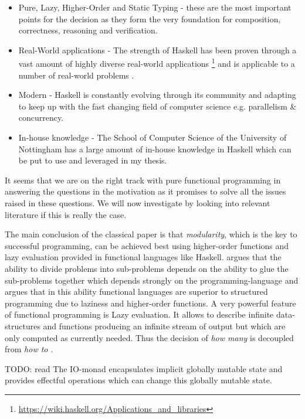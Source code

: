 \begin{itemize}
	\item Pure, Lazy, Higher-Order and Static Typing - these are the most important points for the decision as they form the very foundation for composition, correctness, reasoning and verification. 
	\item Real-World applications - The strength of Haskell has been proven through a vast amount of highly diverse real-world applications \footnote{\url{https://wiki.haskell.org/Applications_and_libraries}} \cite{hudak_history_2007} and is applicable to a number of real-world problems \cite{osullivan_real_2008}.
	\item Modern - Haskell is constantly evolving through its community and adapting to keep up with the fast changing field of computer science e.g. parallelism \& concurrency.
	\item In-house knowledge - The School of Computer Science of the University of Nottingham has a large amount of in-house knowledge in Haskell which can be put to use and leveraged in my thesis.
\end{itemize}

It seems that we are on the right track with pure functional programming in answering the questions in the motivation as it promises to solve all the issues raised in these questions. We will now investigate by looking into relevant literature if this is really the case. 

The main conclusion of the classical paper \cite{hughes_why_1989} is that \textit{modularity}, which is the key to successful programming, can be achieved best using higher-order functions and lazy evaluation provided in functional languages like Haskell. \cite{hughes_why_1989} argues that the ability to divide problems into sub-problems depends on the ability to glue the sub-problems together which depends strongly on the programming-language and \cite{hughes_why_1989} argues that in this ability functional languages are superior to structured programming due to laziness and higher-order functions. A very powerful feature of functional programming is Lazy evaluation. It allows to describe infinite data-structures and functions producing an infinite stream of output but which are only computed as currently needed. Thus the decision of \textit{how many} is decoupled from \textit{how to} .

TODO: read \cite{wadler_essence_1992}
The IO-monad encapsulates implicit globally mutable state and provides effectful operations which can change this globally mutable state. 

